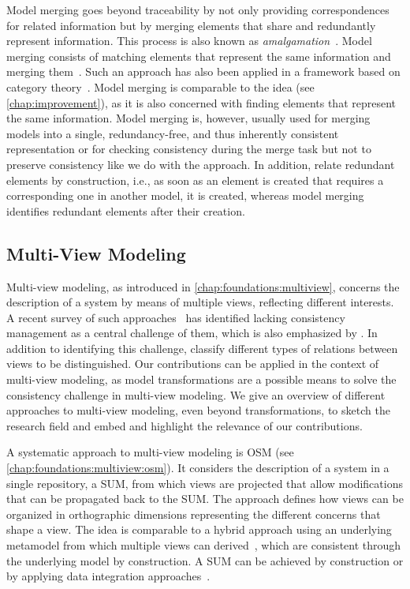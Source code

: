 Model merging goes beyond traceability by not only providing correspondences for related information but by merging elements that share and redundantly represent information.
This process is also known as \emph{amalgamation}~\cite{koenig2017efficientConsistencyChecking-ECMFA}.
Model merging consists of matching elements that represent the same information and merging them~\cite{koenig2017efficientConsistencyChecking-ECMFA}.
Such an approach has also been applied in a framework based on category theory~\cite{diskin2010overlapsHeterogeneous-MDI}.
Model merging is comparable to the \commonalities idea (see \autoref{chap:improvement}), as it is also concerned with finding elements that represent the same information. 
Model merging is, however, usually used for merging models into a single, redundancy-free, and thus inherently consistent representation or for checking consistency during the merge task but not to preserve consistency like we do with the \commonalities approach.
In addition, \commonalities relate redundant elements by construction, i.e., as soon as an element is created that requires a corresponding one in another model, it is created, whereas model merging identifies redundant elements after their creation. 


\subsection{Multi-View Modeling}

Multi-view modeling, as introduced in \autoref{chap:foundations:multiview}, concerns the description of a system by means of multiple views, reflecting different interests.
A recent survey of such approaches~\cite{cicchetti2019multiview-SoSym} has identified lacking consistency management as a central challenge of them, which is also emphasized by \textcite{reineke2019ProblemMultiView-SoSym}.
In addition to identifying this challenge, \textcite{persson2013characterizationMultiView-EMSOFT} classify different types of relations between views to be distinguished.
Our contributions can be applied in the context of multi-view modeling, as model transformations are a possible means to solve the consistency challenge in multi-view modeling.
We give an overview of different approaches to multi-view modeling, even beyond transformations, to sketch the research field and embed and highlight the relevance of our contributions.

A systematic approach to multi-view modeling is \gls{OSM} (see \autoref{chap:foundations:multiview:osm}).
It considers the description of a system in a single repository, a \gls{SUM}, from which views are projected that allow modifications that can be propagated back to the \gls{SUM}.
The approach defines how views can be organized in orthographic dimensions representing the different concerns that shape a view.
The idea is comparable to a hybrid approach using an underlying metamodel from which multiple views can derived~\cite{cicchetti2012hybridMultiView-EASST}, which are consistent through the underlying model by construction.
A \gls{SUM} can be achieved by construction or by applying data integration approaches~\cite{angel2018integration-CLSS}.

